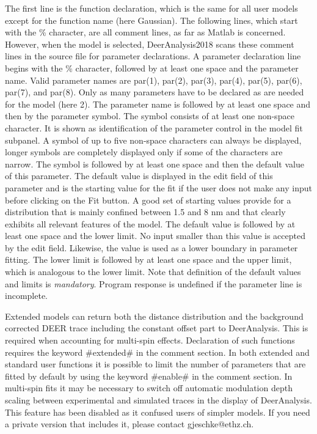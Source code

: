 \documentclass{article}
\begin{document}
The first line is the function declaration, which is the same for all user models except for the function name (here {\ttfamily Gaussian}). The following lines, which start with the \% character, are all comment lines, as far as Matlab is concerned. However, when the model is selected, DeerAnalysis2018 scans these comment lines in the source file for parameter declarations. A parameter declaration line begins with the \% character, followed by at least one space and the parameter name. Valid parameter names are {\ttfamily par(1)}, {\ttfamily par(2)}, {\ttfamily par(3)}, {\ttfamily par(4)}, {\ttfamily par(5)}, {\ttfamily par(6)}, {\ttfamily par(7)}, and {\ttfamily par(8)}. Only as many parameters have to be declared as are needed for the model (here 2). The parameter name is followed by at least one space and then by the parameter symbol. The symbol consists of at least one non-space character. It is shown as identification of the parameter control in the {\ttfamily model fit} subpanel. A symbol of up to five non-space characters can always be displayed, longer symbols are completely displayed only if some of the characters are narrow. The symbol is followed by at least one space and then the default value of this parameter. The default value is displayed in the edit field of this parameter and is the starting value for the fit if the user does not make any input before clicking on the {\ttfamily Fit} button. A good set of starting values provide for a distribution that is mainly confined between 1.5 and 8 nm and that clearly exhibits all relevant features of the model. The default value is followed by at least one space and the lower limit. No input smaller than this value is accepted by the edit field. Likewise, the value is used as a lower boundary in parameter fitting. The lower limit is followed by at least one space and the upper limit, which is analogous to the lower limit. Note that definition of the default values and limits is \emph{mandatory}. Program response is undefined if the parameter line is incomplete.    

Extended models can return both the distance distribution and the background corrected DEER trace including the constant offset part to DeerAnalysis. This is required when accounting for multi-spin effects. Declaration of such functions requires the keyword {\ttfamily \#extended\#} in the comment section. In both extended and standard user functions it is possible to limit the number of parameters that are fitted by default by using the keyword {\ttfamily \#enable\#} in the comment section. In multi-spin fits it may be necessary to switch off automatic modulation depth scaling between experimental and simulated traces in the display of DeerAnalysis. This feature has been disabled as it confused users of simpler models. If you need a private version that includes it, please contact gjeschke@ethz.ch.
\end{document}
